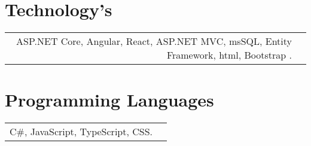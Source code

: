 \section{Technology's}
\begin{tabular}{rl}
 ASP.NET Core, Angular, React, ASP.NET MVC, msSQL, Entity Framework, html, Bootstrap .
\end{tabular}
\section{Programming Languages}
\begin{tabular}{rl}
  \textsc{C\#}, JavaScript, TypeScript, CSS.\\
\end{tabular}


